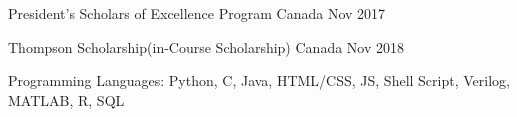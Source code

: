 


\begin{cvhonors}

  \cvhonor
    {President’s Scholars of Excellence Program} %
    {Canada} %
    {Nov 2017} %

  \cvhonor
    {Thompson Scholarship(in-Course Scholarship)} %
    {Canada} %
    {Nov 2018} %

  \cvhonor
    {Programming Languages: Python, C, Java, HTML/CSS, JS, Shell Script, Verilog, MATLAB, R, SQL} %



\end{cvhonors}
